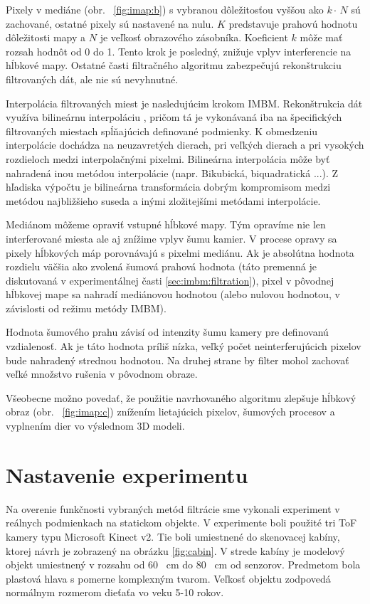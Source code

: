 Pixely v mediáne (obr. \, \ref{fig:imap:b}) s vybranou dôležitosťou vyššou ako $ k \cdot \, N $ sú zachované, ostatné pixely sú nastavené na nulu. $K$ predstavuje prahovú hodnotu dôležitosti mapy a $N$ je veľkosť obrazového zásobníka. Koeficient $k$ môže mať rozsah hodnôt od 0 do 1. Tento krok je posledný, znižuje vplyv interferencie na hĺbkové mapy. Ostatné časti filtračného algoritmu zabezpečujú rekonštrukciu filtrovaných dát, ale nie sú nevyhnutné. 

Interpolácia filtrovaných miest je nasledujúcim krokom IMBM. Rekonštrukcia dát využíva bilineárnu interpoláciu \cite{Volak2019}, pričom tá je vykonávaná iba na špecifických filtrovaných miestach spĺňajúcich definované podmienky. K obmedzeniu interpolácie dochádza na neuzavretých dierach, pri veľkých dierach a pri vysokých rozdieloch medzi interpolačnými pixelmi. Bilineárna interpolácia môže byť nahradená inou metódou interpolácie (napr. Bikubická, biquadratická ...). Z hľadiska výpočtu je bilineárna transformácia dobrým kompromisom medzi metódou najbližšieho suseda a inými zložitejšími metódami interpolácie.

Mediánom môžeme opraviť vstupné hĺbkové mapy. Tým opravíme nie len interferované miesta ale aj znížime vplyv šumu kamier. V procese opravy sa pixely hĺbkových máp porovnávajú s pixelmi mediánu. Ak je absolútna hodnota rozdielu väčšia ako zvolená šumová prahová hodnota (táto premenná je diskutovaná v experimentálnej časti \ref{sec:imbm:filtration}), pixel v pôvodnej hĺbkovej mape sa nahradí mediánovou hodnotou (alebo nulovou hodnotou, v závislosti od režimu metódy IMBM).

Hodnota šumového prahu závisí od intenzity šumu kamery pre definovanú vzdialenosť. Ak je táto hodnota príliš nízka, veľký počet neinterferujúcich pixelov bude nahradený strednou hodnotou. Na druhej strane by filter mohol zachovať veľké množstvo rušenia v pôvodnom obraze.

Všeobecne možno povedať, že použitie navrhovaného algoritmu zlepšuje hĺbkový obraz (obr. \, \ref{fig:imap:c}) znížením lietajúcich pixelov, šumových procesov a vyplnením dier vo výslednom 3D modeli.


\section{Nastavenie experimentu}

Na overenie funkčnosti vybraných metód filtrácie sme vykonali experiment v reálnych podmienkach na statickom objekte. V experimente boli použité tri ToF kamery typu Microsoft Kinect v2. Tie boli umiestnené do skenovacej kabíny, ktorej návrh je zobrazený na obrázku \ref{fig:cabin}. V strede kabíny je modelový objekt umiestnený v rozsahu od 60 \ cm do 80 \ cm od senzorov. Predmetom bola plastová hlava s pomerne komplexným tvarom. Veľkosť objektu zodpovedá normálnym rozmerom dieťaťa vo veku 5-10 rokov.

